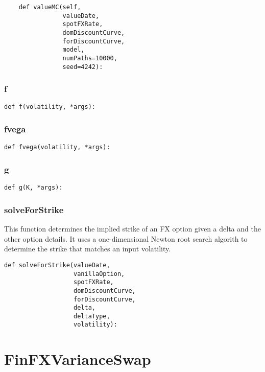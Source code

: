 \documentclass[twoside,11pt]{book}
\begin{document}
\begin{lstlisting}
    def valueMC(self,
                valueDate,
                spotFXRate,
                domDiscountCurve,
                forDiscountCurve,
                model,
                numPaths=10000,
                seed=4242):
\end{lstlisting}

\subsubsection*{{\bf f}}


\begin{lstlisting}
def f(volatility, *args):
\end{lstlisting}

\subsubsection*{{\bf fvega}}


\begin{lstlisting}
def fvega(volatility, *args):
\end{lstlisting}

\subsubsection*{{\bf g}}


\begin{lstlisting}
def g(K, *args):
\end{lstlisting}

\subsubsection*{{\bf solveForStrike}}
This function determines the implied strike of an FX option given a delta and the other option details. It uses a one-dimensional Newton root search algorith to determine the strike that matches an input volatility.  

\begin{lstlisting}
def solveForStrike(valueDate,
                   vanillaOption,
                   spotFXRate,
                   domDiscountCurve,
                   forDiscountCurve,
                   delta,
                   deltaType,
                   volatility):
\end{lstlisting}

\newpage
\section{FinFXVarianceSwap}
\end{document}
